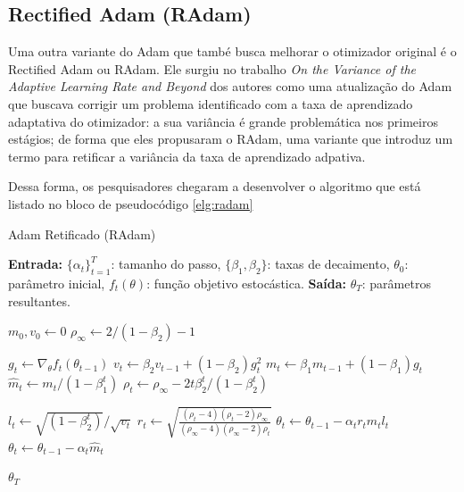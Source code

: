 \subsection{Rectified Adam (RAdam)}

Uma outra variante do Adam que també busca melhorar o otimizador original é o Rectified Adam ou RAdam. Ele surgiu no trabalho \textit{On the Variance of the Adaptive Learning Rate and Beyond} dos autores \textcite{RAdamMethod} como uma atualização do Adam que buscava corrigir um problema identificado com a taxa de aprendizado adaptativa do otimizador: a sua variância é grande problemática nos primeiros estágios; de forma que eles propusaram o RAdam, uma variante que introduz um termo para retificar a variância da taxa de aprendizado adpativa.

Dessa forma, os pesquisadores chegaram a desenvolver o algoritmo que está listado no bloco de pseudocódigo \ref{elg:radam}

\begin{algorithm}[H]
\caption{Adam Retificado (RAdam)}
\label{alg:radam}
\begin{algorithmic}[1]

\State \textbf{Entrada:} $\{\alpha_t\}_{t=1}^T$: tamanho do passo, $\{\beta_1, \beta_2\}$: taxas de decaimento, $\theta_0$: parâmetro inicial, $f_t(\theta)$: função objetivo estocástica.
\State \textbf{Saída:} $\theta_T$: parâmetros resultantes.

\State $m_0, v_0 \leftarrow 0$ 
\State $\rho_{\infty} \leftarrow 2 / (1 - \beta_2) - 1$ 

    \State $g_t \leftarrow \nabla_\theta f_t(\theta_{t-1})$ 
    \State $v_t \leftarrow \beta_2 v_{t-1} + (1 - \beta_2) g_t^2$ 
    \State $m_t \leftarrow \beta_1 m_{t-1} + (1 - \beta_1) g_t$ 
    \State $\hat{m}_t \leftarrow m_t / (1 - \beta_1^t)$ 
    \State $\rho_t \leftarrow \rho_{\infty} - 2t \beta_2^t / (1 - \beta_2^t)$ 
    
        \State $l_t \leftarrow \sqrt{(1 - \beta_2^t)} / \sqrt{v_t}$ 
        \State $r_t \leftarrow \sqrt{\frac{(\rho_t - 4)(\rho_t - 2)\rho_{\infty}}{(\rho_{\infty} - 4)(\rho_{\infty} - 2)\rho_t}}$ 
        \State $\theta_t \leftarrow \theta_{t-1} - \alpha_t r_t \hat{m}_t l_t$ 
    \Else
        \State $\theta_t \leftarrow \theta_{t-1} - \alpha_t \hat{m}_t$ 
    \EndIf
\EndFor

\State \Return $\theta_T$
\end{algorithmic}
\end{algorithm}


